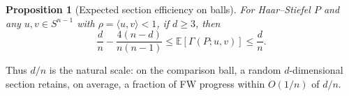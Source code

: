 \documentclass{article}
\newtheorem{proposition}{Proposition}
\begin{document}
\begin{center}
\begin{minipage}[c]{0.57\linewidth}
\begin{proposition}[Expected section efficiency on balls]
\label{prop:EGamma_identity}
For Haar--Stiefel \(P\) and any \(u,v\in S^{n-1}\) with
\(\rho=\langle u,v\rangle<1\), if \(d\ge3\), then
\begin{equation}
\frac dn-\frac{4(n-d)}{n(n-1)}
\le
\mathbb E[\Gamma(P;u,v)]
\le
\frac dn .
\label{eq:EGamma_lower_clean}
\end{equation}
\end{proposition}

\smallskip
\noindent
Thus \(d/n\) is the natural scale: on the comparison ball, a random
\(d\)-dimensional section retains, on average, a fraction of FW progress within
\(O(1/n)\) of \(d/n\).
\end{minipage}
\hfill
\begin{minipage}[c]{0.38\linewidth}
\centering
{}
\end{minipage}
\end{center}
\end{document}
